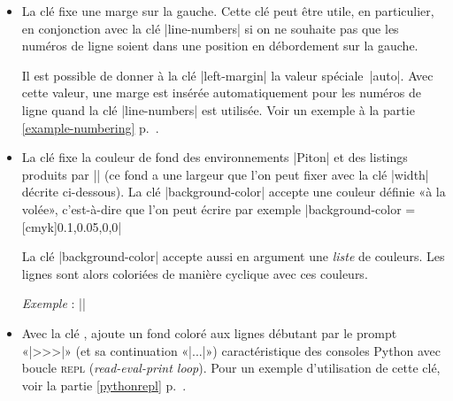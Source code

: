 \documentclass[dvipsnames,svgnames]{article}
\begin{document}
\begin{itemize}
\begin{itemize}
\item La clé  est la distance horizontale entre les numéros de lignes (insérés par
|line-numbers|) et les lignes du code informatique. La valeur initiale est 0.7~em.
\end{itemize}

Pour la commodité, un dispositif de factorisation du préfixe |line-numbers| est disponible, c'est-à-dire que l'on
peut écrire :

\begin{Verbatim}
\PitonOptions
  {
    line-numbers = 
      { 
        skip-empty-lines = false ,
        label-empty-lines = false ,
        sep = 1 em
      }
  }
\end{Verbatim}


\item {} La clé  fixe une marge sur la gauche. Cette clé peut être utile, en particulier, en
conjonction avec la clé |line-numbers| si on ne souhaite pas que les numéros de ligne soient dans une position en
débordement sur la gauche.

Il est possible de donner à la clé |left-margin| la valeur spéciale~|auto|. Avec cette valeur, une marge est
insérée automatiquement pour les numéros de ligne quand la clé |line-numbers| est utilisée. Voir un exemple à la
partie \ref{example-numbering} p.~\pageref{example-numbering}.

\item {} La clé  fixe la couleur de fond des environnements |{Piton}| et des listings
produits par |\PitonInputFile| (ce fond a une largeur que l'on peut fixer avec la clé |width| décrite ci-dessous).
La clé |background-color| accepte une couleur définie «à la volée», c'est-à-dire que l'on peut écrire par exemple
|background-color = [cmyk]{0.1,0.05,0,0}|

\smallskip
La clé |background-color| accepte aussi en argument une \emph{liste} de couleurs. Les lignes sont alors coloriées
de manière cyclique avec ces couleurs.

\emph{Exemple} : ||

\item {} Avec la clé ,  ajoute un fond coloré aux lignes débutant par
le prompt «|>>>|» (et sa continuation «|...|») caractéristique des consoles Python avec boucle \textsc{repl}
(\emph{read-eval-print loop}). Pour un exemple d'utilisation de cette clé, voir la partie \ref{pythonrepl}
p.~\pageref{pythonrepl}.


\end{itemize}
\end{document}
